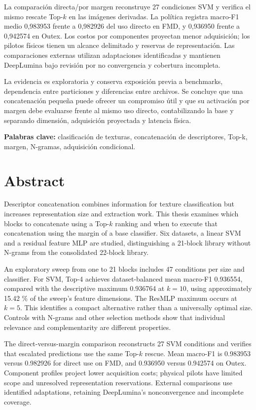 \documentclass[12pt,a4paper]{report}
\begin{document}
La comparación directa/por margen reconstruye 27 condiciones SVM y verifica el mismo rescate Top-\(k\) en las imágenes derivadas. La política registra macro-F1 medio 0,983953 frente a 0,982926 del uso directo en FMD, y 0,936950 frente a 0,942574 en Outex. Los costos por componentes proyectan menor adquisición; los pilotos físicos tienen un alcance delimitado y reservas de representación. Las comparaciones externas utilizan adaptaciones identificadas y mantienen DeepLumina bajo revisión por no convergencia y cobertura incompleta.

La evidencia es exploratoria y conserva exposición previa a benchmarks, dependencia entre particiones y diferencias entre archivos. Se concluye que una concatenación pequeña puede ofrecer un compromiso útil y que su activación por margen debe evaluarse frente al mismo uso directo, contabilizando la base y separando dimensión, adquisición proyectada y latencia física.

\textbf{Palabras clave:} clasificación de texturas, concatenación de descriptores, Top-k, margen, N-gramas, adquisición condicional.

\chapter*{Abstract}
Descriptor concatenation combines information for texture classification but increases representation size and extraction work. This thesis examines which blocks to concatenate using a Top-\(k\) ranking and when to execute that concatenation using the margin of a base classifier. Six datasets, a linear SVM and a residual feature MLP are studied, distinguishing a 21-block library without N-grams from the consolidated 22-block library.

An exploratory sweep from one to 21 blocks includes 47 conditions per size and classifier. For SVM, Top-4 achieves dataset-balanced mean macro-F1 0.936554, compared with the descriptive maximum 0.936764 at \(k=10\), using approximately 15.42 \% of the sweep's feature dimensions. The ResMLP maximum occurs at \(k=5\). This identifies a compact alternative rather than a universally optimal size. Controls with N-grams and other selection methods show that individual relevance and complementarity are different properties.

The direct-versus-margin comparison reconstructs 27 SVM conditions and verifies that escalated predictions use the same Top-\(k\) rescue. Mean macro-F1 is 0.983953 versus 0.982926 for direct use on FMD, and 0.936950 versus 0.942574 on Outex. Component profiles project lower acquisition costs; physical pilots have limited scope and unresolved representation reservations. External comparisons use identified adaptations, retaining DeepLumina's nonconvergence and incomplete coverage.
\end{document}

